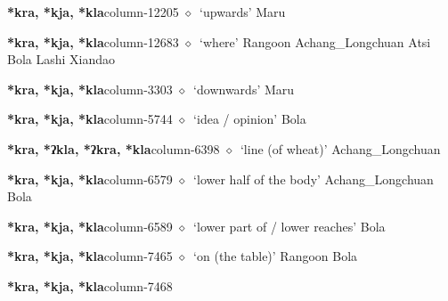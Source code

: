   \item {\footnotesize \textbf{*kra, *kja, *kla}}{\tiny column-12205}
         $\diamond$~`upwards'
         Maru 
  \item {\footnotesize \textbf{*kra, *kja, *kla}}{\tiny column-12683}
         $\diamond$~`where'
         Rangoon 
\hspace{1ex}
         Achang\_Longchuan 
\hspace{1ex}
         Atsi 
\hspace{1ex}
         Bola 
\hspace{1ex}
         Lashi 
\hspace{1ex}
         Xiandao 
  \item {\footnotesize \textbf{*kra, *kja, *kla}}{\tiny column-3303}
         $\diamond$~`downwards'
         Maru 
  \item {\footnotesize \textbf{*kra, *kja, *kla}}{\tiny column-5744}
         $\diamond$~`idea / opinion'
         Bola 
  \item {\footnotesize \textbf{*kra, *ʔkla, *ʔkra, *kla}}{\tiny column-6398}
         $\diamond$~`line (of wheat)'
         Achang\_Longchuan 
  \item {\footnotesize \textbf{*kra, *kja, *kla}}{\tiny column-6579}
         $\diamond$~`lower half of the body'
         Achang\_Longchuan 
\hspace{1ex}
         Bola 
  \item {\footnotesize \textbf{*kra, *kja, *kla}}{\tiny column-6589}
         $\diamond$~`lower part of / lower reaches'
         Bola 
  \item {\footnotesize \textbf{*kra, *kja, *kla}}{\tiny column-7465}
         $\diamond$~`on (the table)'
         Rangoon 
\hspace{1ex}
         Bola 
  \item {\footnotesize \textbf{*kra, *kja, *kla}}{\tiny column-7468}
